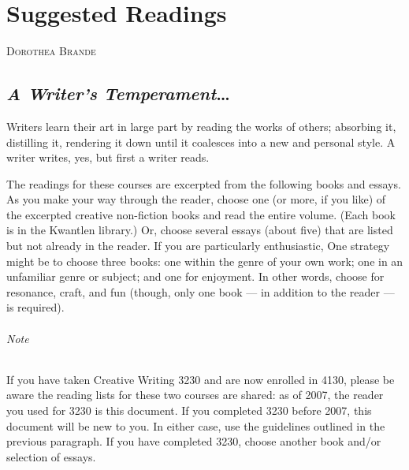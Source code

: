\documentclass[letterpaper,oneside]{memoir}
\begin{document}
\chapter{Suggested Readings}
\begin{epigraphs}
{\textsc{Dorothea Brande}}\\
\end{epigraphs}
\section{\textit{A Writer's Temperament}\ldots}
Writers learn their art in large part by reading the works of others; absorbing it, distilling it, rendering it down until it coalesces into a new and personal style. A writer writes, yes, but first a writer reads.

The readings for these courses are excerpted from the following books and essays. As you make your way through the reader, choose one (or more, if you like) of the excerpted creative non-fiction books and read the entire volume. (Each book is in the Kwantlen library.) Or, choose several essays (about five) that are listed but not already in the reader. If you are particularly enthusiastic, One strategy might be to choose three books: one within the genre of your own work; one in an unfamiliar genre or subject; and one for enjoyment. In other words, choose for resonance, craft, and fun (though, only one book --- in addition to the reader --- is required).

\subparagraph{Note}If you have taken Creative Writing 3230 and are now enrolled in 4130, please be aware the reading lists for these two courses are shared: as of 2007, the reader you used for 3230 is this document. If you completed 3230 before 2007, this document will be new to you. In either case, use the guidelines outlined in the previous paragraph. If you have completed 3230, choose another book and/or selection of essays.
\newpage
\end{document}
